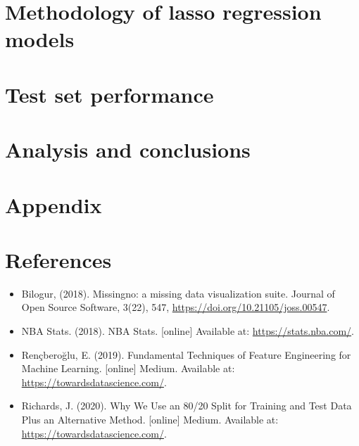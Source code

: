 \documentclass[letterpaper,12pt,twoside,]{pinp}
\begin{document}
\hypertarget{methodology-of-lasso-regression-models}{%
\section{Methodology of lasso regression
models}\label{methodology-of-lasso-regression-models}}

\hypertarget{test-set-performance}{%
\section{Test set performance}\label{test-set-performance}}

\hypertarget{analysis-and-conclusions}{%
\section{Analysis and conclusions}\label{analysis-and-conclusions}}

\hypertarget{appendix}{%
\section{Appendix}\label{appendix}}

\hypertarget{references}{%
\section{References}\label{references}}

\begin{itemize}
\item
  Bilogur, (2018). Missingno: a missing data visualization suite.
  Journal of Open Source Software, 3(22), 547,
  \url{https://doi.org/10.21105/joss.00547}.
\item
  NBA Stats. (2018). NBA Stats. {[}online{]} Available at:
  \url{https://stats.nba.com/}.
\item
  Rençberoğlu, E. (2019). Fundamental Techniques of Feature Engineering
  for Machine Learning. {[}online{]} Medium. Available at:
  \url{https://towardsdatascience.com/}.
\item
  Richards, J. (2020). Why We Use an 80/20 Split for Training and Test
  Data Plus an Alternative Method. {[}online{]} Medium. Available at:
  \url{https://towardsdatascience.com/}.
\end{itemize}





\end{document}
